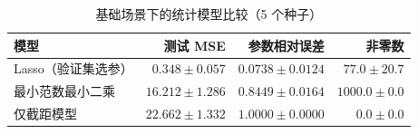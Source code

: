 \begin{table}[htbp]
\centering\small
\caption{基础场景下的统计模型比较（5 个种子）}\label{tab:baselines}
\begin{tabular}{lrrr}
\toprule
模型 & 测试 MSE & 参数相对误差 & 非零数 \\
\midrule
Lasso（验证集选参） & $0.348\pm0.057$ & $0.0738\pm0.0124$ & $77.0\pm20.7$ \\
最小范数最小二乘 & $16.212\pm1.286$ & $0.8449\pm0.0164$ & $1000.0\pm0.0$ \\
仅截距模型 & $22.662\pm1.332$ & $1.0000\pm0.0000$ & $0.0\pm0.0$ \\
\bottomrule
\end{tabular}
\end{table}
